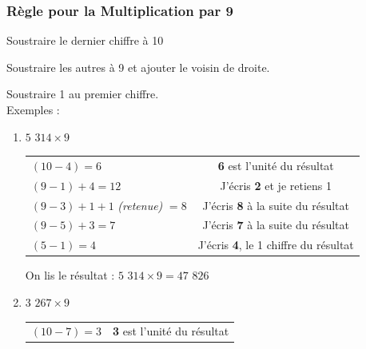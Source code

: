 \documentclass[a4paper]{article}
\begin{document}
\vfill

\pagebreak





\subsubsection*{Règle pour la Multiplication par 9}

Soustraire le dernier chiffre à 10

Soustraire les autres à 9 et ajouter le voisin de droite.

Soustraire 1 au premier chiffre.\\

{ \parindent=0.5cm Exemples : }

\begin{small}
\begin{enumerate}

	\item $5$ $314 \times 9$
	
	\begin{tabular}{l|c}

		$(10 - 4) = 6$ & \textbf{6} est l'unité du résultat
		
		\tabularnewline
		
		$(9 - 1) + 4 = 12$ & J'écris \textbf{2} et je retiens 1
		
		\tabularnewline
		
		$(9 - 3) + 1 + 1$ \textit{(retenue)} $= 8$ & J'écris \textbf{8} à la suite du résultat
		
		\tabularnewline
		
		$(9 - 5) + 3 = 7$ & J'écris \textbf{7} à la suite du résultat
		
		\tabularnewline
		
		$(5 - 1)  = 4$ & J'écris \textbf{4}, le 1\up{er} chiffre du résultat
		
	\end{tabular}

	On lis le résultat : {\boldmath $5$ $314 \times 9 = 47$ $826$}\\
	
	


	\item $3$ $267 \times 9$
	
	\begin{tabular}{l|c}

		$(10 - 7) = 3$ & \textbf{3} est l'unité du résultat
		
		\tabularnewline
		

\end{tabular}
\end{enumerate}
\end{small}
\end{document}
